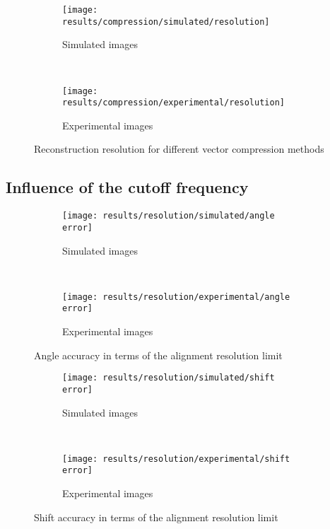 \documentclass[../main.tex]{subfiles}
\begin{document}
\begin{figure}[htbp]
    \centering
    \begin{subfigure}[b]{.8\textwidth}
         \centering
         \texttt{[image: results/compression/simulated/resolution]}
         \caption{Simulated images}
    \end{subfigure}\\
    \vspace{2em}
    \begin{subfigure}[b]{.8\textwidth}
         \centering
         \texttt{[image: results/compression/experimental/resolution]}
         \caption{Experimental images}
    \end{subfigure}
    \caption{Reconstruction resolution for different vector compression methods}
    \label{fig:5:compression_resolution}
\end{figure}


\subsection{Influence of the cutoff frequency}
\begin{figure}[htbp]
    \centering
    \begin{subfigure}[b]{.8\textwidth}
         \centering
         \texttt{[image: results/resolution/simulated/angle error]}
         \caption{Simulated images}
    \end{subfigure}\\
    \vspace{2em}
    \begin{subfigure}[b]{.8\textwidth}
         \centering
         \texttt{[image: results/resolution/experimental/angle error]}
         \caption{Experimental images}
    \end{subfigure}
    \caption{Angle accuracy in terms of the alignment resolution limit}
    \label{fig:5:resolution_angle_accuracy}
\end{figure}

\begin{figure}[htbp]
    \centering
    \begin{subfigure}[b]{.8\textwidth}
         \centering
         \texttt{[image: results/resolution/simulated/shift error]}
         \caption{Simulated images}
    \end{subfigure}\\
    \vspace{2em}
    \begin{subfigure}[b]{.8\textwidth}
         \centering
         \texttt{[image: results/resolution/experimental/shift error]}
         \caption{Experimental images}
    \end{subfigure}
    \caption{Shift accuracy in terms of the alignment resolution limit}
    \label{fig:5:resolution_shift_accuracy}
\end{figure}
\end{document}
